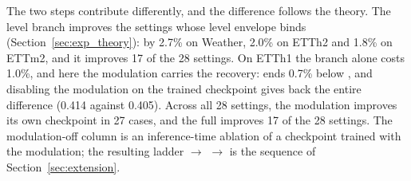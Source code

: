 {\begin{table}[t]
\end{table}

The two steps contribute differently, and the difference follows the theory. The level branch improves the settings whose level envelope binds (Section~\ref{sec:exp_theory}): by 2.7\% on Weather, 2.0\% on ETTh2 and 1.8\% on ETTm2, and it improves 17 of the 28 settings. On ETTh1 the branch alone costs 1.0\%, and here the modulation carries the recovery: \sysLA ends 0.7\% below \sysname, and disabling the modulation on the trained checkpoint gives back the entire difference (0.414 against 0.405). Across all 28 settings, the modulation improves its own checkpoint in 27 cases, and the full \sysLA improves 17 of the 28 settings. The modulation-off column is an inference-time ablation of a checkpoint trained with the modulation; the resulting ladder \sysname $\to$ \sysL $\to$ \sysLA is the sequence of Section~\ref{sec:extension}.

}
